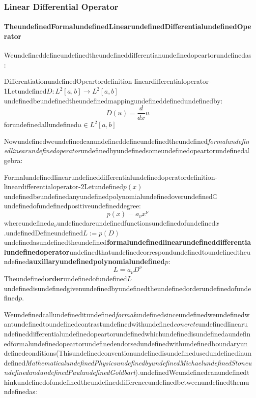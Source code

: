 \subsubsection{Linear Differential Operator}

\paragraph{TheundefinedFormalundefinedLinearundefinedDifferentialundefinedOperator}

Weundefineddefineundefinedtheundefineddifferentianundefinedopeartorundefinedas:

\begin{mystthmdefinition}{DifferentiationundefinedOpeartor}{definition-lineardifferentialoperator-1}Letundefined$D:L^2[a,b]\to L^2[a,b]$undefinedbeundefinedtheundefinedmappingundefineddefinedundefinedby:
\begin{equation}
D(u)=\frac{d}{dx}u
\end{equation}
forundefinedallundefined$u\in L^2[a,b]$

\end{mystthmdefinition}
Nowundefinedweundefinedcanundefineddefineundefinedtheundefined\textit{formalundefinedlinearundefinedoperator}undefinedbyundefinedsomeundefinedopeartorundefinedalgebra:

\begin{mystthmdefinition}{Formalundefinedlinearundefineddifferentialundefinedoperator}{definition-lineardifferentialoperator-2}Letundefined$p(x)$undefinedbeundefinedanyundefinedpolynomialundefinedoverundefined$\mathbb{C}$undefinedofundefinedpositiveundefineddegree:
\begin{equation}
p(x)=a_\nu x^\nu
\end{equation}
whereundefined$a_{\nu}$undefinedareundefinedfunctionsundefinedofundefined$x$.undefinedDefineundefined$L:=p(D)$undefinedasundefinedtheundefined\textbf{formalundefinedlinearundefineddifferentialundefinedoperator}undefinedthatundefinedcorrespondundefinedtoundefinedtheundefined\textbf{auxillaryundefinedpolynomialundefined$p$}:
\begin{equation}
L=a_\nu D^{\nu}
\end{equation}
Theundefined\textbf{order}undefinedofundefined$L$undefinedisundefinedgivenundefinedbyundefinedtheundefinedorderundefinedofundefined$p$.

\end{mystthmdefinition}
Weundefinedcallundefineditundefined\textit{formal}undefinedsinceundefinedweundefinedwantundefinedtoundefinedcontrastundefinedwithundefined\textit{concrete}undefinedlinearundefineddifferentialundefinedopeartorundefinedwhichundefinedisundefinedaundefinedformalundefinedopeartorundefinedendorsedundefinedwithundefinedboundaryundefinedconditions(Thisundefinedconventionundefinedisundefinedusedundefinedinundefined\textit{MathematicalundefinedPhysicsundefinedbyundefinedMichaelundefinedStoneundefinedandundefinedPaulundefinedGoldbart}).undefinedWeundefinedcanundefinedthinkundefinedofundefinedtheundefineddifferenceundefinedbetweenundefinedthemundefinedas:

